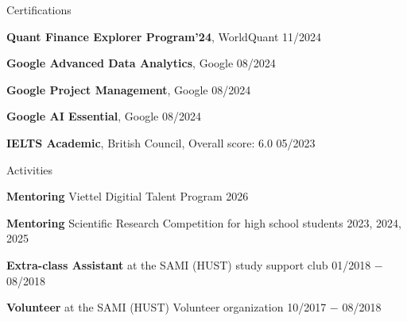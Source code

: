 \documentclass{resume} %
\begin{document}
\begin{rSection}{Certifications}
\vspace{-1.25em}
\item {\bf Quant Finance Explorer Program'24}, WorldQuant \hfill {11/2024}
\item {\bf Google Advanced Data Analytics}, Google \hfill {08/2024}
\item {\bf Google Project Management}, Google \hfill {08/2024}
\item {\bf Google AI Essential}, Google \hfill {08/2024}
\item {\bf IELTS Academic}, British Council, Overall score: 6.0 \hfill 05/2023
\end{rSection}
\begin{rSection}{Activities}
\vspace{-1.25em}
\item \textbf{Mentoring} Viettel Digitial Talent Program \hfill 2026
\item \textbf{Mentoring} Scientific Research Competition for high school students \hfill 2023, 2024, 2025
\item \textbf{Extra-class Assistant} at the SAMI (HUST) study support club \hfill 01/2018 $-$ 08/2018
\item \textbf{Volunteer} at the SAMI (HUST) Volunteer organization \hfill 10/2017 $-$ 08/2018
\end{rSection} 
\end{document}
